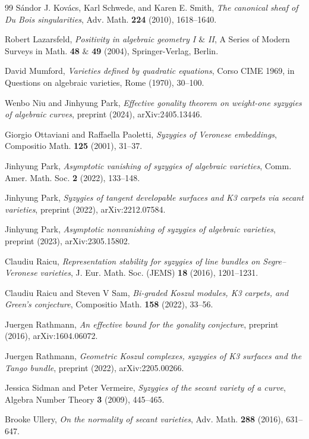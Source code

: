 \documentclass[graybox]{svmult}
\begin{document}
\begin{thebibliography}{99}
S\'{a}ndor J. Kov\'{a}cs, Karl Schwede, and Karen E. Smith, \textit{The canonical sheaf of Du Bois singularities},  Adv. Math. \textbf{224} (2010), 1618--1640.

Robert Lazarsfeld, \textit{Positivity in algebraic geometry I $\&$ II}, A Series of Modern Surveys in Math. \textbf{48} $\&$ \textbf{49} (2004), Springer-Verlag, Berlin.

David Mumford, \textit{Varieties defined by quadratic equations}, Corso CIME 1969, in Questions on
algebraic varieties, Rome (1970),  30--100.

Wenbo Niu and Jinhyung Park, \textit{Effective gonality theorem on weight-one syzygies of algebraic curves}, preprint (2024), arXiv:2405.13446.

Giorgio Ottaviani and Raffaella Paoletti, \textit{Syzygies of Veronese embeddings}, Compositio Math. \textbf{125} (2001), 31--37.

Jinhyung Park, \textit{Asymptotic vanishing of syzygies of algebraic varieties}, Comm. Amer. Math. Soc. \textbf{2} (2022), 133--148.

Jinhyung Park, \textit{Syzygies of tangent developable surfaces and K3 carpets via secant varieties}, preprint (2022), arXiv:2212.07584.

Jinhyung Park, \textit{Asymptotic nonvanishing of syzygies of algebraic varieties}, preprint (2023), arXiv:2305.15802.

Claudiu Raicu, \textit{Representation stability for syzygies of line bundles on Segre--Veronese varieties}, J. Eur. Math. Soc. (JEMS) \textbf{18} (2016), 1201--1231.
	
Claudiu Raicu and Steven V Sam, \textit{Bi-graded Koszul modules, K3 carpets, and Green’s conjecture}, Compositio Math. \textbf{158} (2022), 33--56.

Juergen Rathmann, \textit{An effective bound for the gonality conjecture}, preprint (2016), arXiv:1604.06072.

Juergen Rathmann, \textit{Geometric Koszul complexes, syzygies of K3 surfaces and the Tango bundle}, preprint (2022), arXiv:2205.00266.

Jessica Sidman and Peter Vermeire, \textit{Syzygies of the secant variety of a curve}, Algebra Number Theory \textbf{3} (2009), 445--465.

Brooke Ullery, \textit{On the normality of secant varieties}, Adv. Math. \textbf{288} (2016), 631--647.


\end{thebibliography}
\end{document}
